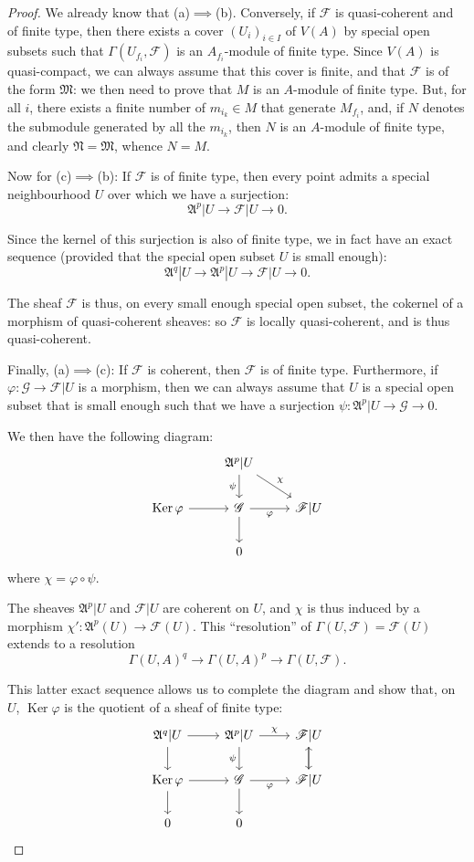 \documentclass{article}
\newcommand{\scr}[1]{{\mathscr{#1}}}
\DeclareMathOperator{\Ker}{Ker}
\newcommand{\oldpage}[1]{\marginpar{\footnotesize$\Big\vert$ \textit{p.~#1}}}
\begin{document}
\begin{proof}
  We already know that (a)$\implies$(b).
  Conversely, if $\scr{F}$ is quasi-coherent and of finite type, then there exists a cover $(U_i)_{i\in I}$ of $V(A)$ by special open subsets such that $\Gamma(U_{f_i},\scr{F})$ is an $A_{f_i}$-module of finite type.
  Since $V(A)$ is quasi-compact, we can always assume that this cover is finite, and that $\scr{F}$ is of the form $\mathfrak{M}$:
  we then need to prove that $M$ is an $A$-module of finite type.
  But, for all $i$, there exists a finite number of $m_{i_k}\in M$ that generate $M_{f_i}$, and, if $N$ denotes the submodule generated by all the $m_{i_k}$, then $N$ is an $A$-module of finite type, and clearly $\mathfrak{N}=\mathfrak{M}$, whence $N=M$.

  \bigskip
  Now for (c)$\implies$(b):
  If $\scr{F}$ is of finite type, then every point admits a special neighbourhood $U$ over which we have a surjection:
\oldpage{1-10}
  \[
    \mathfrak{A}^p|U \to \scr{F}|U \to 0.
  \]

  Since the kernel of this surjection is also of finite type, we in fact have an exact sequence (provided that the special open subset $U$ is small enough):
  \[
    \mathfrak{A}^q|U \to \mathfrak{A}^p|U \to \scr{F}|U \to 0.
  \]

  The sheaf $\scr{F}$ is thus, on every small enough special open subset, the cokernel of a morphism of quasi-coherent sheaves:
  so $\scr{F}$ is locally quasi-coherent, and is thus quasi-coherent.

  \bigskip
  Finally, (a)$\implies$(c):
  If $\scr{F}$ is coherent, then $\scr{F}$ is of finite type.
  Furthermore, if $\varphi\colon\scr{G}\to\scr{F}|U$ is a morphism, then we can always assume that $U$ is a special open subset that is small enough such that we have a surjection $\psi\colon\mathfrak{A}^p|U\to\scr{G}\to0$.

  We then have the following diagram:
  \[
    \begin{tikzcd}
      & \mathfrak{A}^p|U \dar[swap,"\psi"] \drar["\chi"] &
    \\\Ker\varphi \rar & \scr{G} \rar[swap,"\varphi"] \dar & \scr{F}|U
    \\ & 0 &
    \end{tikzcd}
  \]
  where $\chi=\varphi\circ\psi$.

  The sheaves $\mathfrak{A}^p|U$ and $\scr{F}|U$ are coherent on $U$, and $\chi$ is thus induced by a morphism $\chi'\colon\mathfrak{A}^p(U)\to\scr{F}(U)$.
  This ``resolution'' of $\Gamma(U,\scr{F})=\scr{F}(U)$ extends to a resolution
  \[
    \Gamma(U,A)^q \to \Gamma(U,A)^p \to \Gamma(U,\scr{F}).
  \]

  This latter exact sequence allows us to complete the diagram and show that, on $U$, $\Ker\varphi$ is the quotient of a sheaf of finite type:
  \[
    \begin{tikzcd}
      \mathfrak{A}^q|U \rar \dar & \mathfrak{A}^p|U \rar["\chi"] \dar[swap,"\psi"] & \scr{F}|U \dar
    \\\Ker\varphi \rar \dar & \scr{G} \rar[swap,"\varphi"] \dar & \scr{F}|U \uar
    \\ 0 & 0 &
    \end{tikzcd}
  \]
\end{proof}
\end{document}
